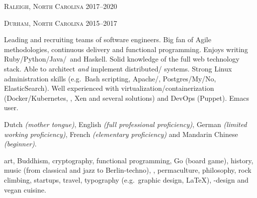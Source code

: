 \documentclass[10pt,letterpaper]{article}
\begin{document}

{\textsc{Raleigh, North Carolina}} {%
	{2017--2020}
	{}
}

{\textsc{Durham, North Carolina}}
{
	{2015--2017} %
	{}
}\spacedhrule{0.5em}{-0.4em}


{Leading and recruiting teams of software engineers.
	Big fan of Agile methodologies, continuous delivery and functional programming.
	Enjoys writing Ruby/\nsp{}Python/\nsp{}Java/\nsp{}\CPP~and Haskell.
	Solid knowledge of the full web technology stack.
	Able to architect \textit{and} implement distributed/ systems.
	Strong Linux administration skills (e.g.\ Bash scripting, Apache/, Postgres/My/No, ElasticSearch).
	Well experienced with virtualization/containerization (Docker/Kubernetes, , Xen and several  solutions) and DevOps (Puppet).
	Emacs user.
}

\vspace{0.5em}
{Dutch \emph{(mother tongue)}, English \emph{(full professional proficiency)}, German \emph{(limited working proficiency)}, French \emph{(elementary proficiency)} and Mandarin Chinese \emph{(beginner)}.}\spacedhrule{1.6em}{-0.4em}


{art, Buddhism, cryptography, functional programming, Go (board game), history, music (from classical and jazz to Berlin-techno), , permaculture, philosophy, rock climbing, startups, travel, typography (e.g.\ graphic design, \LaTeX), -design and vegan cuisine.}
\end{document}
